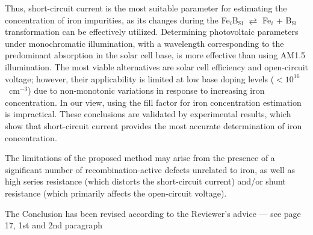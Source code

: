 \documentclass[a4paper,fleqn]{cas-sc}
\begin{document}
Thus, short-circuit current is the most suitable parameter for estimating the concentration of iron impurities, as its changes during the 
Fe$_i$B$_\mathrm{Si}$ $\rightleftarrows$ Fe$_i$ + B$_\mathrm{Si}$ transformation can be effectively utilized.
Determining photovoltaic parameters under monochromatic illumination, 
with a wavelength corresponding to the predominant absorption in the solar cell base, is more effective than using AM1.5 illumination.
The most viable alternatives are solar cell efficiency and open-circuit voltage; 
however, their applicability is limited at low base doping levels ($<10^{16}$~cm$^{-3}$) 
due to non-monotonic variations in response to increasing iron concentration.
In our view, using the fill factor for iron concentration estimation is impractical.
These conclusions are validated by experimental results, which show that short-circuit current provides the most accurate determination of iron concentration.

The limitations of the proposed method may arise from the presence of a significant 
number of recombination-active defects unrelated to iron, 
as well as high series resistance (which distorts the short-circuit current) and/or shunt resistance (which primarily affects the open-circuit voltage).

The Conclusion has been revised according to the Reviewer's advice --- see page 17, 1st and 2nd paragraph
\end{document}
